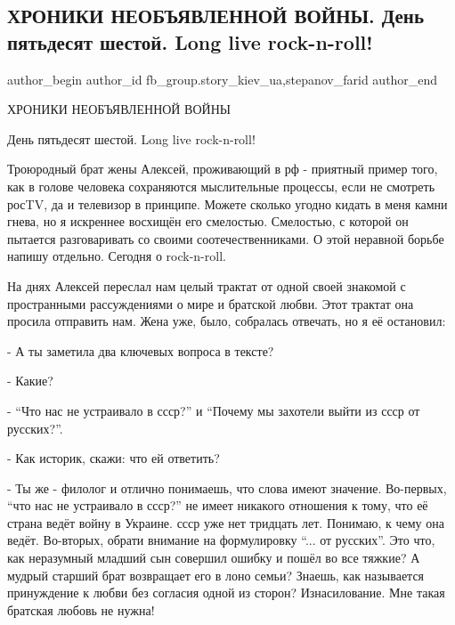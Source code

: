  
 
 
 
 
 
\subsection{ХРОНИКИ НЕОБЪЯВЛЕННОЙ ВОЙНЫ. День пятьдесят шестой. Long live rock-n-roll!}
\label{sec:20_04_2022.fb.fb_group.story_kiev_ua.1.rock_n_roll}
 
\ifcmt
 author_begin
   author_id fb_group.story_kiev_ua,stepanov_farid
 author_end
\fi

ХРОНИКИ НЕОБЪЯВЛЕННОЙ ВОЙНЫ

День пятьдесят шестой. Long live rock-n-roll!

Троюродный брат жены Алексей, проживающий в рф - приятный пример того, как в
голове человека сохраняются мыслительные процессы, если не смотреть росTV, да
и телевизор в принципе. Можете сколько угодно кидать в меня камни гнева, но я
искреннее восхищён его смелостью. Смелостью, с которой он пытается
разговаривать со своими соотечественниками. О этой неравной борьбе напишу
отдельно. Сегодня о rock-n-roll.


На днях Алексей переслал нам целый трактат от одной своей знакомой с
пространными рассуждениями о мире и братской любви. Этот трактат она просила
отправить нам. Жена уже, было, собралась отвечать, но я её остановил:

- А ты заметила два ключевых вопроса в тексте?

- Какие?

- \enquote{Что нас не устраивало в ссср?} и \enquote{Почему мы захотели выйти из ссср от
русских?}.

- Как историк, скажи: что ей ответить?

- Ты же - филолог и отлично понимаешь, что слова имеют значение. Во-первых,
\enquote{что нас не устраивало в ссср?} не имеет никакого отношения к тому, что её
страна ведёт войну в Украине. ссср уже нет тридцать лет. Понимаю, к чему она
ведёт. Во-вторых, обрати внимание на формулировку \enquote{... от русских}. Это что,
как неразумный младший сын совершил ошибку и пошёл во все тяжкие? А мудрый
старший брат возвращает его в лоно семьи? Знаешь, как называется принуждение к
любви без согласия одной из сторон? Изнасилование. Мне такая братская любовь не
нужна! 

